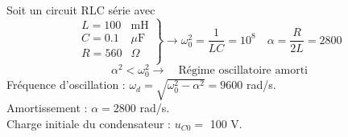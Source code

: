 \begin{testexample} 
	Soit un circuit RLC série avec 
\[\left.\begin{array}{rl}
L=100 & \text{mH}\\
C=0.1 & \mu\text{F}\\
R=560 & \Omega\\
\end{array}\right\}\rightarrow \omega_0^2=\frac{1}{LC}=10^8 \quad \alpha=\frac{R}{2L}=2800
\]
\[\alpha^2 < \omega_0^2 \rightarrow \quad \text{Régime oscillatoire amorti}\]
Fréquence d'oscillation : $\omega_d=\sqrt{\omega_0^2-\alpha^2}=9600$ rad/s.\\
Amortissement : $\alpha=2800$ rad/s.\\
Charge initiale du condensateur : $u_{C0}=$ 100 V.\\


\end{testexample}

